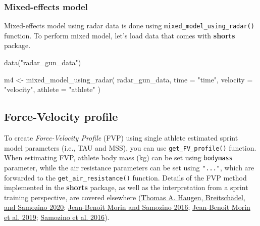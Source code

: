 \documentclass[fleqn,10pt]{wlpeerj} %
\newenvironment{Shaded}{\begin{snugshade}}{\end{snugshade}}
\newcommand{\AttributeTok}[1]{\textcolor[rgb]{0.77,0.63,0.00}{#1}}
\newcommand{\FunctionTok}[1]{\textcolor[rgb]{0.00,0.00,0.00}{#1}}
\newcommand{\NormalTok}[1]{#1}
\newcommand{\OtherTok}[1]{\textcolor[rgb]{0.56,0.35,0.01}{#1}}
\newcommand{\StringTok}[1]{\textcolor[rgb]{0.31,0.60,0.02}{#1}}
\begin{document}
\normalsize

\hypertarget{mixed-effects-model-1}{%
\subsubsection{Mixed-effects model}\label{mixed-effects-model-1}}

Mixed-effects model using radar data is done using \texttt{mixed\_model\_using\_radar()} function. To perform mixed model, let's load data that comes with \textbf{shorts} package.

\small

\begin{Shaded}
\begin{Highlighting}[]
\FunctionTok{data}\NormalTok{(}\StringTok{"radar\_gun\_data"}\NormalTok{)}

\NormalTok{m4 }\OtherTok{\textless{}{-}} \FunctionTok{mixed\_model\_using\_radar}\NormalTok{(}
\NormalTok{  radar\_gun\_data,}
  \AttributeTok{time =} \StringTok{"time"}\NormalTok{,}
  \AttributeTok{velocity =} \StringTok{"velocity"}\NormalTok{,}
  \AttributeTok{athlete =} \StringTok{"athlete"}
\NormalTok{)}
\end{Highlighting}
\end{Shaded}

\normalsize

\hypertarget{force-velocity-profile}{%
\subsection{Force-Velocity profile}\label{force-velocity-profile}}

To create \emph{Force-Velocity Profile} (FVP) using single athlete estimated sprint model parameters (i.e., TAU and MSS), you can use \texttt{get\_FV\_profile()} function. When estimating FVP, athlete body mass (kg) can be set using \texttt{bodymass} parameter, while the air resistance parameters can be set using \texttt{"..."}, which are forwarded to the \texttt{get\_air\_resistance()} function. Details of the FVP method implemented in the \textbf{shorts} package, as well as the interpretation from a sprint training perspective, are covered elsewhere (\protect\hyperlink{ref-haugenPowerForceVelocityProfilingSprinting2020}{Thomas A. Haugen, Breitschädel, and Samozino 2020}; \protect\hyperlink{ref-morinInterpretingPowerForceVelocityProfiles2016}{Jean-Benoit Morin and Samozino 2016}; \protect\hyperlink{ref-morinSimpleMethodComputing2019}{Jean-Benoit Morin et al. 2019}; \protect\hyperlink{ref-samozinoSimpleMethodMeasuring2016}{Samozino et al. 2016}).
\end{document}
